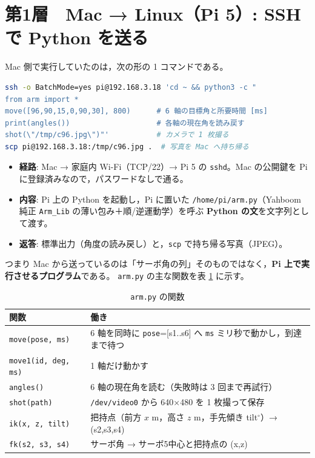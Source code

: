 \documentclass[a4paper,11pt]{article}
\begin{document}
\section{第1層　Mac → Linux（Pi 5）: SSH で Python を送る}

Mac 側で実行していたのは，次の形の 1 コマンドである。

\begin{lstlisting}[language=bash]
ssh -o BatchMode=yes pi@192.168.3.18 'cd ~ && python3 -c "
from arm import *
move([96,90,15,0,90,30], 800)      # 6 軸の目標角と所要時間 [ms]
print(angles())                    # 各軸の現在角を読み戻す
shot(\"/tmp/c96.jpg\")"'           # カメラで 1 枚撮る
scp pi@192.168.3.18:/tmp/c96.jpg .  # 写真を Mac へ持ち帰る
\end{lstlisting}

\begin{itemize}
  \item \textbf{経路}: Mac → 家庭内 Wi-Fi（TCP/22）→ Pi 5 の \texttt{sshd}。Mac の公開鍵を Pi に登録済みなので，パスワードなしで通る。
  \item \textbf{内容}: Pi 上の Python を起動し，Pi に置いた \texttt{/home/pi/arm.py}（Yahboom 純正 \texttt{Arm\_Lib} の薄い包み＋順/逆運動学）を呼ぶ \textbf{Python の文}を文字列として渡す。
  \item \textbf{返答}: 標準出力（角度の読み戻し）と，\texttt{scp} で持ち帰る写真（JPEG）。
\end{itemize}

つまり Mac から送っているのは「サーボ角の列」そのものではなく，\textbf{Pi 上で実行させるプログラム}である。
\texttt{arm.py} の主な関数を表 \ref{tab:armpy} に示す。

\begin{table}[h]
\centering\small
\begin{tabular}{@{}ll@{}}
\toprule
関数 & 働き \\
\midrule
\texttt{move(pose, ms)}     & 6 軸を同時に \texttt{pose}=[s1..s6] へ \texttt{ms} ミリ秒で動かし，到達まで待つ \\
\texttt{move1(id, deg, ms)} & 1 軸だけ動かす \\
\texttt{angles()}           & 6 軸の現在角を読む（失敗時は 3 回まで再試行） \\
\texttt{shot(path)}         & \texttt{/dev/video0} から 640×480 を 1 枚撮って保存 \\
\texttt{ik(x, z, tilt)}     & 把持点（前方 $x$ m，高さ $z$ m，手先傾き tilt$^\circ$）→ (s2,s3,s4) \\
\texttt{fk(s2, s3, s4)}     & サーボ角 → サーボ5中心と把持点の (x,z) \\
\bottomrule
\end{tabular}
\caption{\texttt{arm.py} の関数}\label{tab:armpy}
\end{table}
\end{document}
